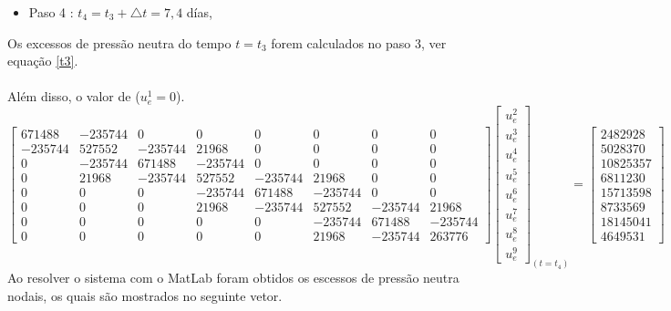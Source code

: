 \documentclass{article} %
\begin{document}
\begin{itemize}
	\item Paso 4 : \(t_4=t_3+\triangle t=7,4\) días,
\end{itemize}

Os excessos de pressão neutra do tempo \(t=t_3\) forem calculados no paso 3, ver equação \ref{t3}.\\
\\
\indent Além disso, o valor de (\(u_e^1=0\)).\\

\begin{equation*}
\begin{bmatrix}
671488& -235744& 0& 0& 0& 0& 0& 0\\
-235744&527552&-235744&21968& 0& 0& 0& 0\\
0&-235744&671488&-235744& 0& 0& 0& 0\\
0&21968&-235744&527552&-235744&21968& 0& 0\\
0&0&0& -235744&671488&-235744& 0& 0\\
0&0&0&21968&-235744&527552&-235744&21968\\
0&0&0&0&0&-235744&671488&-235744\\
0&0&0&0&0&21968&-235744&263776
\end{bmatrix}\begin{bmatrix}
u_e^2\\
u_e^3\\
u_e^4\\
u_e^5\\
u_e^6\\
u_e^7\\
u_e^8\\
u_e^9
\end{bmatrix}_{(t=t_4)}
=\begin{bmatrix}
2482928\\
5028370\\
10825357\\
6811230\\
15713598\\
8733569\\
18145041\\
4649531
\end{bmatrix}
\end{equation*}
\indent Ao resolver o sistema com o MatLab foram obtidos os escessos de pressão neutra nodais, os quais são mostrados no seguinte vetor.
\end{document}
